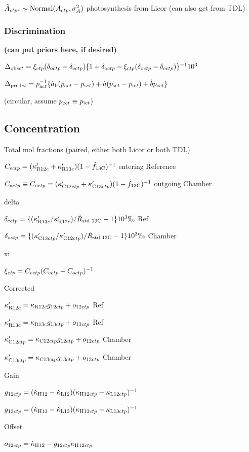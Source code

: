 \documentclass[12pt]{article}
\begin{document}
$\sdataAL \sim \Normal(\sAL, \ssigAL)$ photosynthesis from Licor (can also get from TDL)


\subsubsection{Discrimination}

{\bf (can put priors here, if desired)}

$\sDeltaobs = \sxi(\sdeltao-\sdeltae)\{1+\sdeltao-\sxi(\sdeltao-\sdeltae)\}^{-1}10^3$

$\sDeltapred = \spa^{-1} \{ \sdotab(\spa-\sps) + \sdota(\sps-\spi) + \sdotb\spc \}$

(circular, assume $\spc\equiv\spi$)



\subsection{Concentration}

\noindent
Total mol fractions (paired, either both Licor or both TDL)

$\sCe = (\skappaRtwp+\skappaRthp)(1-\sdotfthC)^{-1}$ entering Reference

$\sCa \equiv \sCo = (\skappaCtwp+\skappaCthp)(1-\sdotfthC)^{-1}$ outgoing Chamber

\noindent
delta

$\sdeltae = \{ (\skappaRthp/\skappaRtwp)/\sdotRstd - 1 \} 10^3\permil$ Ref

$\sdeltao = \{ (\skappaCthp/\skappaCtwp)/\sdotRstd - 1 \} 10^3\permil$ Chamber

\noindent
xi

$\sxi=\sCe(\sCe-\sCo)^{-1}$

\noindent
Corrected

$\skappaRtwp = \skappaRtw\sgtw + \sotw$ Ref

$\skappaRthp = \skappaRth\sgth + \soth$ Ref

$\skappaCtwp = \skappaCtw\sgtw + \sotw$ Chamber

$\skappaCthp = \skappaCth\sgth + \soth$ Chamber

\noindent
Gain

$\sgtw = (\sdotkappaHtw - \sdotkappaLtw)(\skappaHtw - \skappaLtw)^{-1}$

$\sgth = (\sdotkappaHth - \sdotkappaLth)(\skappaHth - \skappaLth)^{-1}$

\noindent
Offset

$\sotw = \sdotkappaHtw - \sgtw\skappaHtw$
\end{document}
